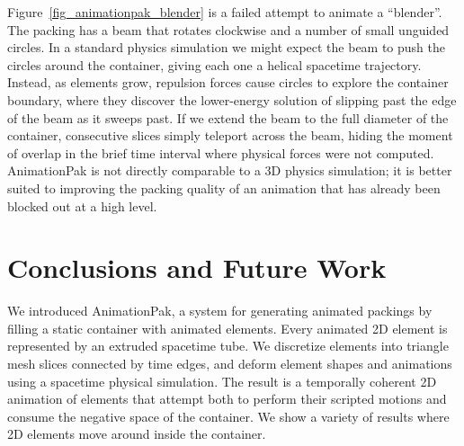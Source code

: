 Figure~\ref{fig_animationpak_blender} is a failed attempt to animate a ``blender''.
The packing has a beam that rotates clockwise
and a number of small unguided circles.  
In a standard physics simulation we might expect the beam to push the 
circles around the container, giving each one a helical spacetime 
trajectory.
Instead, as elements grow, repulsion forces cause circles to explore the 
container boundary, where they discover the lower-energy solution of 
slipping past the edge of the beam as it sweeps past.
If we extend the beam to the full diameter of the container,
consecutive slices simply teleport across the beam, hiding the moment of
overlap in the brief time interval where physical forces were not computed.
AnimationPak is not directly comparable to a
3D physics simulation; it is better suited to improving the
packing quality of an animation that has already been blocked out at a 
high level.


\section{Conclusions and Future Work}
\label{animationpak_conclusions}

We introduced AnimationPak, a system for 
generating animated packings by filling a static container with animated
elements.  Every animated 2D element is represented by an extruded 
spacetime tube.
We discretize elements into triangle mesh slices connected by time edges,
and deform element shapes and animations using a spacetime physical
simulation.  The result is a temporally coherent 2D animation of elements
that attempt both to perform their scripted motions and consume the negative
space of the container.
We show a variety of results where
2D elements move around inside the container.


